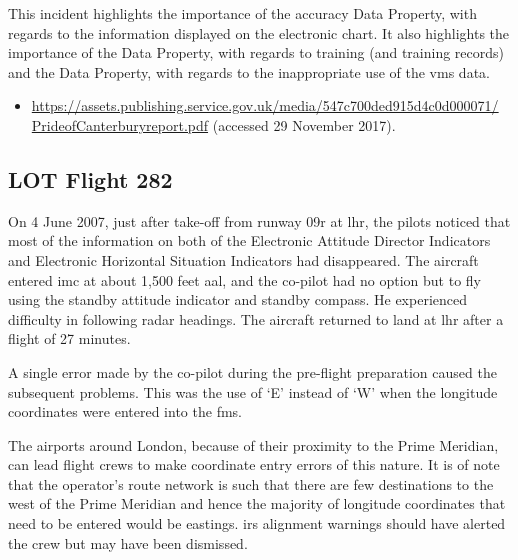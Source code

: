 This incident highlights the importance of the \gls{accuracy} Data Property, with regards to the information displayed on the electronic chart. It also highlights the importance of the  Data Property, with regards to training (and training records) and the  Data Property, with regards to the inappropriate use of the \gls{vms} data.

\begin{samepage}
\begin{itemize}
  \item \raggedright{\href{https://assets.publishing.service.gov.uk/media/547c700ded915d4c0d000071/PrideofCanterburyreport.pdf}{https://assets.publishing.service.gov.uk/media/547c700ded915d4c0d000071/ PrideofCanterburyreport.pdf} (accessed 29 November 2017).}
\end{itemize}
\end{samepage}


\subsection{LOT Flight 282} \label{bkm:incacc:lot282}
On 4 June 2007, just after take-off from runway 09r at \gls{lhr}, the pilots noticed that most of the information on both of the Electronic Attitude Director Indicators and Electronic Horizontal Situation Indicators had disappeared. The aircraft entered \gls{imc} at about 1,500 feet \gls{aal}, and the co-pilot had no option but to fly using the standby attitude indicator and standby compass. He experienced difficulty in following radar headings. The aircraft returned to land at \gls{lhr} after a flight of 27 minutes.

A single error made by the co-pilot during the pre-flight preparation caused the subsequent problems. This was the use of `E' instead of `W' when the longitude coordinates were entered into the \gls{fms}.

The airports around London, because of their proximity to the Prime Meridian, can lead flight crews to make coordinate entry errors of this nature. It is of note that the operator's route network is such that there are few destinations to the west of the Prime Meridian and hence the majority of longitude coordinates that need to be entered would be eastings. \gls{irs} alignment warnings should have alerted the crew but may have been dismissed.

